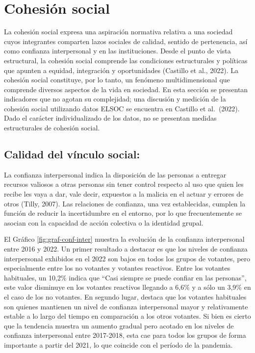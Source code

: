 \documentclass[
  12pt,
]{book}
\begin{document}
\hypertarget{cohesiuxf3n-social}{%
\chapter{Cohesión social}\label{cohesiuxf3n-social}}

La cohesión social expresa una aspiración normativa relativa a una sociedad cuyos integrantes comparten lazos sociales de calidad, sentido de pertenencia, así como confianza interpersonal y en las instituciones. Desde el punto de vista estructural, la cohesión social comprende las condiciones estructurales y políticas que apunten a equidad, integración y oportunidades (Castillo et al., 2022). La cohesión social constituye, por lo tanto, un fenómeno multidimensional que comprende diversos aspectos de la vida en sociedad. En esta sección se presentan indicadores que no agotan su complejidad; una discusión y medición de la cohesión social utilizando datos ELSOC se encuentra en Castillo et al.~(2022). Dado el carácter individualizado de los datos, no se presentan medidas estructurales de cohesión social.

\hypertarget{calidad-del-vuxednculo-social}{%
\section{Calidad del vínculo social:}\label{calidad-del-vuxednculo-social}}

La confianza interpersonal indica la disposición de las personas a entregar recursos valiosos a otras personas sin tener control respecto al uso que quien les recibe les vaya a dar, vale decir, expuestos a la malicia en el actuar y errores de otros (Tilly, 2007). Las relaciones de confianza, una vez establecidas, cumplen la función de reducir la incertidumbre en el entorno, por lo que frecuentemente se asocian con la capacidad de acción colectiva o la identidad grupal.

El Gráfico \ref{fig:graf-conf-inter} muestra la evolución de la confianza interpersonal entre 2016 y 2022. Un primer resultado a destacar es que los niveles de confianza interpersonal exhibidos en el 2022 son bajos en todos los grupos de votantes, pero especialmente entre los no votantes y votantes reactivos. Entre los votantes habituales, un 10,2\% indica que ``Casi siempre se puede confiar en las personas'', este valor disminuye en los votantes reactivos llegando a 6,6\% y a sólo un 3,9\% en el caso de los no votantes. En segundo lugar, destaca que los votantes habituales son quienes mantienen un nivel de confianza interpersonal mayor y relativamente estable a lo largo del tiempo en comparación a los otros votantes. Si bien es cierto que la tendencia muestra un aumento gradual pero acotado en los niveles de confianza interpersonal entre 2017-2018, esta cae para todos los grupos de forma importante a partir del 2021, lo que coincide con el período de la pandemia.
\end{document}
